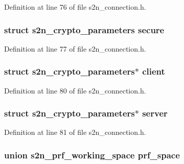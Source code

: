 Definition at line 76 of file s2n\+\_\+connection.\+h.

\subsubsection[{\texorpdfstring{secure}{secure}}]{\setlength{\rightskip}{0pt plus 5cm}struct {\bf s2n\+\_\+crypto\+\_\+parameters} secure}\hypertarget{structs2n__connection_aaa284f060d5075d1526931181d9e4fa7}{}\label{structs2n__connection_aaa284f060d5075d1526931181d9e4fa7}


Definition at line 77 of file s2n\+\_\+connection.\+h.

\subsubsection[{\texorpdfstring{client}{client}}]{\setlength{\rightskip}{0pt plus 5cm}struct {\bf s2n\+\_\+crypto\+\_\+parameters}$\ast$ client}\hypertarget{structs2n__connection_a052f81d7dc7e2612341fe0da1e749ebd}{}\label{structs2n__connection_a052f81d7dc7e2612341fe0da1e749ebd}


Definition at line 80 of file s2n\+\_\+connection.\+h.

\subsubsection[{\texorpdfstring{server}{server}}]{\setlength{\rightskip}{0pt plus 5cm}struct {\bf s2n\+\_\+crypto\+\_\+parameters}$\ast$ server}\hypertarget{structs2n__connection_abfab1f3796089e3576e73286c0b6889c}{}\label{structs2n__connection_abfab1f3796089e3576e73286c0b6889c}


Definition at line 81 of file s2n\+\_\+connection.\+h.

\subsubsection[{\texorpdfstring{prf\+\_\+space}{prf_space}}]{\setlength{\rightskip}{0pt plus 5cm}union {\bf s2n\+\_\+prf\+\_\+working\+\_\+space} prf\+\_\+space}\hypertarget{structs2n__connection_a6e6bdc3e7f6925490c4ed56405acdc10}{}\label{structs2n__connection_a6e6bdc3e7f6925490c4ed56405acdc10}


